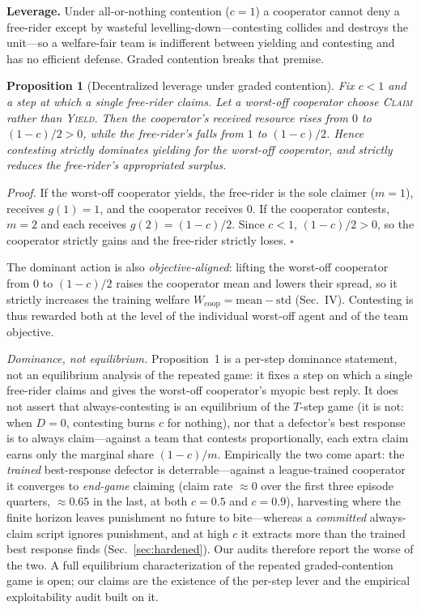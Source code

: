 \documentclass[conference, a4paper]{IEEEtran}
\newtheorem{proposition}{Proposition}
\begin{document}
\textbf{Leverage.} Under all-or-nothing contention ($c{=}1$) a cooperator cannot
deny a free-rider except by wasteful levelling-down---contesting collides and
destroys the unit---so a welfare-fair team is indifferent between yielding and
contesting and has no efficient defense. Graded contention breaks that premise.

\begin{proposition}[Decentralized leverage under graded contention]
Fix $c<1$ and a step at which a single free-rider claims. Let a worst-off
cooperator choose \textsc{Claim} rather than \textsc{Yield}. Then the cooperator's
received resource rises from $0$ to $(1{-}c)/2>0$, while the free-rider's falls
from $1$ to $(1{-}c)/2$. Hence contesting \emph{strictly dominates} yielding for the
worst-off cooperator, and strictly reduces the free-rider's appropriated surplus.
\end{proposition}

\noindent\emph{Proof.} If the worst-off cooperator yields, the free-rider is the
sole claimer ($m{=}1$), receives $g(1){=}1$, and the cooperator receives $0$. If
the cooperator contests, $m{=}2$ and each receives $g(2){=}(1{-}c)/2$. Since $c<1$,
$(1{-}c)/2>0$, so the cooperator strictly gains and the free-rider strictly loses.
$\square$

\noindent The dominant action is also \emph{objective-aligned}: lifting the
worst-off cooperator from $0$ to $(1{-}c)/2$ raises the cooperator mean and lowers
their spread, so it strictly increases the training welfare
$W_{\mathrm{coop}}{=}\mathrm{mean}{-}\mathrm{std}$ (Sec.~IV). Contesting is thus
rewarded both at the level of the individual worst-off agent and of the team
objective.

\noindent\emph{Dominance, not equilibrium.} Proposition~1 is a per-step dominance
statement, not an equilibrium analysis of the repeated game: it fixes a step on
which a single free-rider claims and gives the worst-off cooperator's myopic best
reply. It does not assert that always-contesting is an equilibrium of the $T$-step
game (it is not: when $D{=}0$, contesting burns $c$ for nothing), nor that a
defector's best response is to always claim---against a team that contests
proportionally, each extra claim earns only the marginal share $(1{-}c)/m$.
Empirically the two come apart: the \emph{trained} best-response defector is
deterrable---against a league-trained cooperator it converges to \emph{end-game}
claiming (claim rate ${\approx}0$ over the first three episode quarters,
${\approx}0.65$ in the last, at both $c{=}0.5$ and $c{=}0.9$), harvesting where
the finite horizon leaves punishment no future to bite---whereas a
\emph{committed} always-claim script ignores punishment, and at high $c$ it
extracts more than the trained best response finds (Sec.~\ref{sec:hardened}). Our audits therefore report the worse of the two. A full
equilibrium characterization of the repeated graded-contention game is open; our
claims are the existence of the per-step lever and the empirical exploitability
audit built on it.
\end{document}
